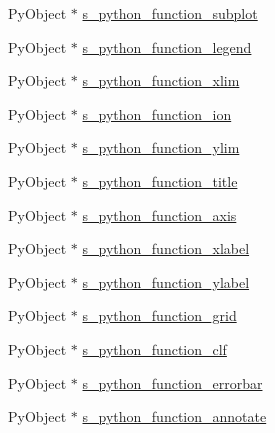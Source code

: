 \begin{DoxyCompactItemize}
\item 
Py\+Object $\ast$ \hyperlink{structmatplotlibcpp_1_1detail_1_1__interpreter_ac7d8c33ba71612dd19572014c952c7db}{s\+\_\+python\+\_\+function\+\_\+subplot}
\item 
Py\+Object $\ast$ \hyperlink{structmatplotlibcpp_1_1detail_1_1__interpreter_a28c5ce55339fd939a1a7e00cb8186f1d}{s\+\_\+python\+\_\+function\+\_\+legend}
\item 
Py\+Object $\ast$ \hyperlink{structmatplotlibcpp_1_1detail_1_1__interpreter_a078b733c5d391a091049b6ef00488b38}{s\+\_\+python\+\_\+function\+\_\+xlim}
\item 
Py\+Object $\ast$ \hyperlink{structmatplotlibcpp_1_1detail_1_1__interpreter_ace1bd6a5906a7f74cc1b38ebe24b8b65}{s\+\_\+python\+\_\+function\+\_\+ion}
\item 
Py\+Object $\ast$ \hyperlink{structmatplotlibcpp_1_1detail_1_1__interpreter_afa69df018d0a76c3525693f09197176f}{s\+\_\+python\+\_\+function\+\_\+ylim}
\item 
Py\+Object $\ast$ \hyperlink{structmatplotlibcpp_1_1detail_1_1__interpreter_a74fae3504387acebd6c1515ba10c0c75}{s\+\_\+python\+\_\+function\+\_\+title}
\item 
Py\+Object $\ast$ \hyperlink{structmatplotlibcpp_1_1detail_1_1__interpreter_a56892306d24918fbe5eaeade997bb611}{s\+\_\+python\+\_\+function\+\_\+axis}
\item 
Py\+Object $\ast$ \hyperlink{structmatplotlibcpp_1_1detail_1_1__interpreter_a25279a4bc59b40e4f48c7491c6ec5af3}{s\+\_\+python\+\_\+function\+\_\+xlabel}
\item 
Py\+Object $\ast$ \hyperlink{structmatplotlibcpp_1_1detail_1_1__interpreter_aa90a8153eb9c50bf42a26ea1689fbf19}{s\+\_\+python\+\_\+function\+\_\+ylabel}
\item 
Py\+Object $\ast$ \hyperlink{structmatplotlibcpp_1_1detail_1_1__interpreter_a38630747267b258d93229eaea64610eb}{s\+\_\+python\+\_\+function\+\_\+grid}
\item 
Py\+Object $\ast$ \hyperlink{structmatplotlibcpp_1_1detail_1_1__interpreter_a072f6b7a261385e68f773c3f74622d96}{s\+\_\+python\+\_\+function\+\_\+clf}
\item 
Py\+Object $\ast$ \hyperlink{structmatplotlibcpp_1_1detail_1_1__interpreter_a082b7b746d5ebe138b1a136944d0a4ca}{s\+\_\+python\+\_\+function\+\_\+errorbar}
\item 
Py\+Object $\ast$ \hyperlink{structmatplotlibcpp_1_1detail_1_1__interpreter_af63d49cff0820f3324b12da812c9a266}{s\+\_\+python\+\_\+function\+\_\+annotate}
\item 

\end{DoxyCompactItemize}
